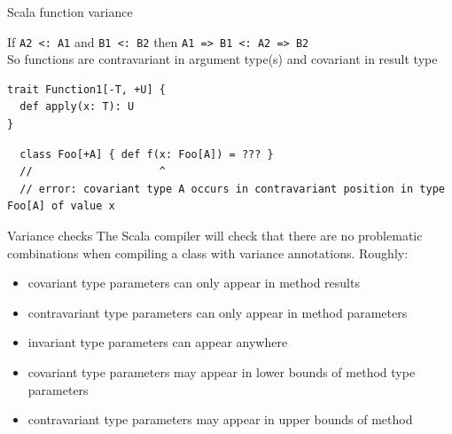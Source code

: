 \documentclass[aspectratio=169]{beamer}
\begin{document}
\begin{frame}[fragile]{Scala function variance}
\vspace{-2em}
\begin{block}{}
If \texttt{A2 <: A1} and \texttt{B1 <: B2} then \texttt{A1 => B1 <: A2 => B2} \\
So functions are contravariant in argument type(s) and covariant in result type
\end{block}
\vspace{1em}
\begin{verbatim}
trait Function1[-T, +U] {
  def apply(x: T): U
}
\end{verbatim}
\pause
\vspace{1em}
\begin{verbatim}
  class Foo[+A] { def f(x: Foo[A]) = ??? }
  //                    ^
  // error: covariant type A occurs in contravariant position in type Foo[A] of value x
\end{verbatim}
\end{frame}


\begin{frame}[fragile]{Variance checks}
The Scala compiler will check that there are no problematic combinations when compiling a class with
variance annotations. Roughly:
\begin{itemize}
  \item covariant type parameters can only appear in method results
  \item contravariant type parameters can only appear in method parameters
  \item invariant type parameters can appear anywhere
    \pause
  \item covariant type parameters may appear in lower bounds of method type parameters
  \item contravariant type parameters may appear in upper bounds of method
\end{itemize}
\end{frame}
\end{document}
